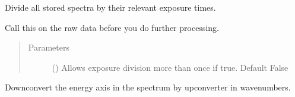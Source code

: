 \documentclass[a4paper,10pt,english]{sphinxmanual}
\begin{document}
\begin{fulllineitems}
\begin{fulllineitems}

\begin{fulllineitems}
\label{\detokenize{sfgtools:sfgtools.SFGProcessTools.SFGDataStore.creationtime}}
\end{fulllineitems}


\begin{fulllineitems}
\label{\detokenize{sfgtools:sfgtools.SFGProcessTools.SFGDataStore.divide_exposure}}
\sphinxAtStartPar
Divide all stored spectra by their relevant exposure times.

\sphinxAtStartPar
Call this on the raw data before you do further processing.
\begin{quote}\begin{description}
\item[{Parameters}] \leavevmode
\sphinxAtStartPar
{} (\sphinxstyleliteralemphasis{\sphinxupquote{, }}) \textendash{} Allows exposure division more than once if true. Default False

\end{description}\end{quote}

\end{fulllineitems}


\begin{fulllineitems}
\label{\detokenize{sfgtools:sfgtools.SFGProcessTools.SFGDataStore.downconvert_spectrum}}
\sphinxAtStartPar
Downconvert the energy axis in the spectrum by upconverter in wavenumbers.


\end{fulllineitems}
\end{fulllineitems}
\end{fulllineitems}
\end{document}
